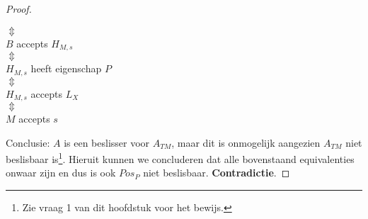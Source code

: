 \begin{proof}
\begin{center}
		$\Updownarrow$\\
		$B$ accepts $H_{M,s}$\\
		$\Updownarrow$\\
		$H_{M,s}$ heeft eigenschap $P$\\
		$\Updownarrow$\\
		$H_{M,s}$ accepts $L_X$\\
		$\Updownarrow$\\
		$M$ accepts $s$
	\end{center}
	Conclusie: $A$ is een beslisser voor $A_{TM}$, maar dit is onmogelijk aangezien $A_{TM}$ niet beslisbaar is\footnote{Zie vraag 1 van dit hoofdstuk voor het bewijs.}. Hieruit kunnen we concluderen dat alle bovenstaand equivalenties onwaar zijn en dus is  ook $Pos_P$ niet beslisbaar. \textbf{Contradictie}.
\end{proof}